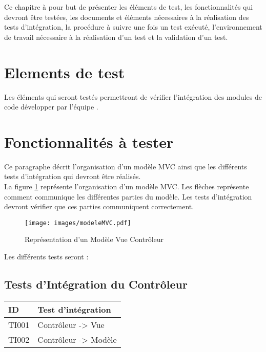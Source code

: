   
  Ce chapitre à pour but de présenter les éléments de test, les fonctionnalités qui devront être testées, les documents et éléments nécessaires à la réalisation des tests d'intégration, la procédure à suivre une fois un test exécuté, l'environnement de travail nécessaire à la réalisation d'un test et la validation d'un test. 
 
 
 \section{Elements de test}
 	Les éléments qui seront testés permettront de vérifier l'intégration des modules de code développer par l'équipe \nomEquipe.
 	
 \section{Fonctionnalités à tester}
	Ce paragraphe décrit l'organisation d'un modèle MVC ainsi que les différents tests d'intégration qui devront être réalisés. \\ 	
 	
 	La figure \ref{modeleMVC} représente l'organisation d'un modèle MVC. Les flèches représente comment communique les différentes parties du modèle. Les tests d'intégration devront vérifier que ces parties communiquent correctement.
 	
 	\begin{figure}[H]
 		\centering
 		\texttt{[image: images/modeleMVC.pdf]}
 		\caption{Représentation d'un Modèle Vue Contrôleur}
 		\label{modeleMVC}
 	\end{figure}
 	
 Les différents tests seront :\\
 
 \subsection*{Tests d'Intégration du Contrôleur}
  \begin{center}
    \begin{tabular}[h]{|p{}|p{}|}
	\hline
	ID & Test d'intégration \\\hline
        TI001 & Contrôleur -> Vue \\\hline
        TI002 & Contrôleur -> Modèle \\\hline
     \end{tabular}
  \end{center}
  
